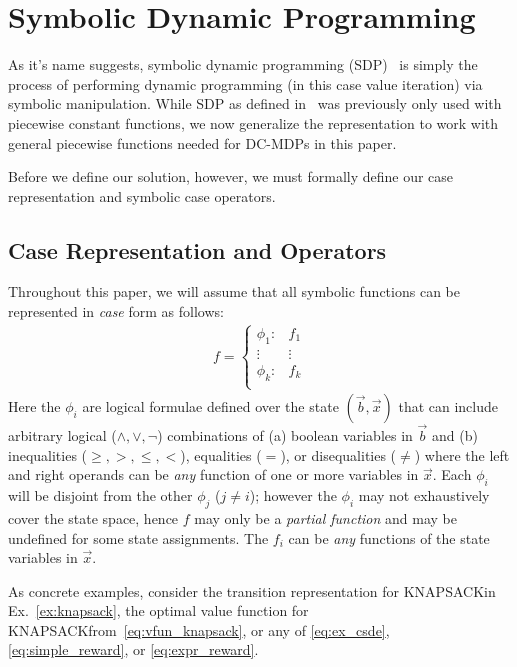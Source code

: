 \documentclass[letterpaper]{article}
\begin{document}
\section{Symbolic Dynamic Programming}

As it's name suggests, symbolic dynamic programming (SDP)~\cite{fomdp}
is simply the process of performing dynamic programming (in this case
value iteration) via symbolic manipulation.  While SDP as defined
in~\cite{fomdp} was previously only used with piecewise
constant functions, we now generalize the representation to work with
general piecewise functions needed for DC-MDPs in this paper.  

Before we define our solution, however, we must formally define our
case representation and symbolic case operators.

\subsection{Case Representation and Operators}

Throughout this paper, we will assume that all symbolic functions
can be represented in \emph{case} form as follows:
{%
\begin{align*}
f = 
\begin{cases}
  \phi_1: & f_1 \\ 
 \vdots&\vdots\\ 
  \phi_k: & f_k \\ 
\end{cases}
\end{align*}
}
Here the $\phi_i$ are logical formulae defined over the state
$(\vec{b},\vec{x})$ that can include arbitrary logical ($\land,\lor,\neg$)
combinations of (a) boolean variables in $\vec{b}$ and (b) 
inequalities ($\geq,>,\leq,<$), equalities ($=$), or disequalities ($\neq$)
where the left and right operands can be \emph{any} function of one or more 
variables in $\vec{x}$.  
Each $\phi_i$ will be disjoint from the other $\phi_j$ ($j \neq i$); 
however the $\phi_i$ may not exhaustively cover the state space, hence
$f$ may only be a \emph{partial function} and may be undefined for some
state assignments.
The $f_i$ can be \emph{any} functions of the state
variables in $\vec{x}$.  

As concrete examples, consider the transition representation for
KNAPSACKin Ex.~\ref{ex:knapsack}, the optimal value function for
KNAPSACKfrom~\eqref{eq:vfun_knapsack}, or any of
\eqref{eq:ex_csde}, \eqref{eq:simple_reward}, or \eqref{eq:expr_reward}.
\end{document}

